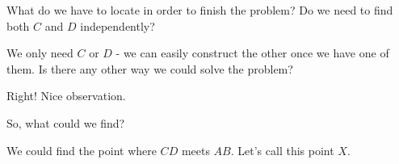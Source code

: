 What do we have to locate in order to finish the problem?  Do we need to find both $C$ and $D$ independently?










We only need $C$ or $D$ - we can easily construct the other once we have one of them. Is there any other way we could solve the problem?


Right! Nice observation.

So, what could we find?


We could find the point where $CD$ meets $AB.$ Let's call this point $X.$




